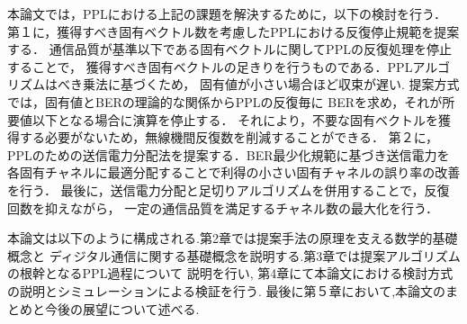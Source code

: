 本論文では，PPLにおける上記の課題を解決するために，以下の検討を行う．
第１に，獲得すべき固有ベクトル数を考慮したPPLにおける反復停止規範を提案する．
通信品質が基準以下である固有ベクトルに関してPPLの反復処理を停止することで，
獲得すべき固有ベクトルの足きりを行うものである．PPLアルゴリズムはべき乗法に基づくため，
固有値が小さい場合ほど収束が遅い. 提案方式では，固有値とBERの理論的な関係からPPLの反復毎に
BERを求め，それが所要値以下となる場合に演算を停止する．
それにより，不要な固有ベクトルを獲得する必要がないため，無線機間反復数を削減することができる．
第２に，PPLのための送信電力分配法を提案する．BER最少化規範に基づき送信電力を
各固有チャネルに最適分配することで利得の小さい固有チャネルの誤り率の改善を行う．
最後に，送信電力分配と足切りアルゴリズムを併用することで，反復回数を抑えながら，
一定の通信品質を満足するチャネル数の最大化を行う．

 本論文は以下のように構成される.第2章では提案手法の原理を支える数学的基礎概念と
ディジタル通信に関する基礎概念を説明する.第3章では提案アルゴリズムの根幹となるPPL過程について
説明を行い, 第4章にて本論文における検討方式の説明とシミュレーションによる検証を行う.
最後に第５章において,本論文のまとめと今後の展望について述べる.
